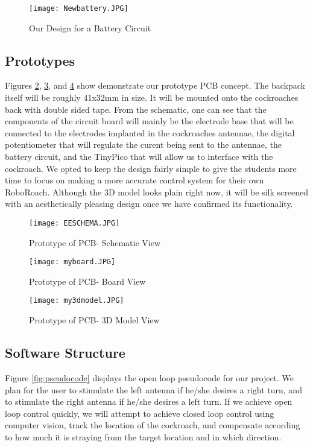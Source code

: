 \documentclass{article}
\begin{document}
\begin{figure}[ht!]
\centering
\texttt{[image: Newbattery.JPG]}
\caption{Our Design for a Battery Circuit}
\label{fig:newbatt}
\end{figure}

\subsection{Prototypes}
\par Figures \ref{fig:schematic}, \ref{fig:board}, and \ref{fig:3d} show demonstrate our prototype PCB concept. The backpack itself will be roughly 41x32mm in size. It will be mounted onto the cockroaches back with double sided tape. From the schematic, one can see that the components of the circuit board will mainly be the electrode base that will be connected to the electrodes implanted in the cockroaches antennae, the digital potentiometer that will regulate the curent being sent to the antennae, the battery circuit, and the TinyPico that will allow us to interface with the cockroach. We opted to keep the design fairly simple to give the students more time to focus on making a more accurate control system for their own RoboRoach. Although the 3D model looks plain right now, it will be silk screened with an aesthetically pleasing design once we have confirmed its functionality.

\begin{figure}[ht!]
\centering
\texttt{[image: EESCHEMA.JPG]}
\caption{Prototype of PCB- Schematic View}
\label{fig:schematic}
\end{figure}

\begin{figure}[ht!]
\centering
\texttt{[image: myboard.JPG]}
\caption{Prototype of PCB- Board View}
\label{fig:board}
\end{figure}

\begin{figure}[ht!]
\centering
\texttt{[image: my3dmodel.JPG]}
\caption{Prototype of PCB- 3D Model View}
\label{fig:3d}
\end{figure}


\subsection{Software Structure}
\par Figure \ref{fig:pseudocode} displays the open loop pseudocode for our project. We plan for the user to stimulate the left antenna if he/she desires a right turn, and to stimulate the right antenna if he/she desires a left turn. If we achieve open loop control quickly, we will attempt to achieve closed loop control using computer vision, track the location of the cockroach, and compensate according to how much it is straying from the target location and in which direction.
\end{document}
